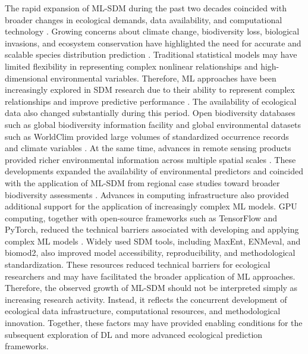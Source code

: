 \documentclass[authoryear,preprint,review,12pt]{elsarticle}
\begin{document}
The rapid expansion of ML-SDM during the past two decades coincided with broader changes in ecological demands, data availability, and computational technology \citep{elith2009species,guisan2005predicting}. Growing concerns about climate change, biodiversity loss, biological invasions, and ecosystem conservation have highlighted the need for accurate and scalable species distribution prediction \citep{pacifici2017species,hooper2012global}. Traditional statistical models may have limited flexibility in representing complex nonlinear relationships and high-dimensional environmental variables. Therefore, ML approaches have been increasingly explored in SDM research due to their ability to represent complex relationships and improve predictive performance \citep{pichler2023machine}. The availability of ecological data also changed substantially during this period. Open biodiversity databases such as global biodiversity information facility and global environmental datasets such as WorldClim provided large volumes of standardized occurrence records and climate variables \citep{telenius2011biodiversity,fick2017worldclim}. At the same time, advances in remote sensing products provided richer environmental information across multiple spatial scales \citep{wulder2004high}. These developments expanded the availability of environmental predictors and coincided with the application of ML-SDM from regional case studies toward broader biodiversity assessments \citep{reichstein2019deep}. Advances in computing infrastructure also provided additional support for the application of increasingly complex ML models. GPU computing, together with open-source frameworks such as TensorFlow and PyTorch, reduced the technical barriers associated with developing and applying complex ML models \citep{owens2008gpu,abadi2016tensorflow,paszke2019pytorch}. Widely used SDM tools, including MaxEnt, ENMeval, and biomod2, also improved model accessibility, reproducibility, and methodological standardization\citep{phillips2006maximum, kass2021enmeval, thuiller2009biomod}. These resources reduced technical barriers for ecological researchers and may have facilitated the broader application of ML approaches. Therefore, the observed growth of ML-SDM should not be interpreted simply as increasing research activity. Instead, it reflects the concurrent development of ecological data infrastructure, computational resources, and methodological innovation. Together, these factors may have provided enabling conditions for the subsequent exploration of DL and more advanced ecological prediction frameworks.
\end{document}
